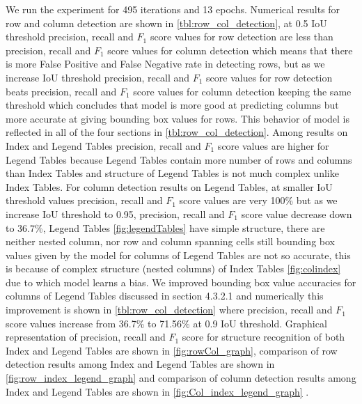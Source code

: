 We run the experiment for 495 iterations and 13 epochs. Numerical results for row and column detection are shown in \autoref{tbl:row_col_detection}, at 0.5 IoU threshold precision, recall and $F_1$ score values for row detection are less than precision, recall and $F_1$ score values for column detection which means that there is more False Positive and False Negative rate in detecting rows, but as we increase IoU threshold precision, recall and $F_1$ score values for row detection beats precision, recall and $F_1$ score values for column detection keeping the same threshold which concludes that model is more good at predicting columns but more accurate at giving bounding box values for rows. This behavior of model is reflected in all of the four sections in \autoref{tbl:row_col_detection}. Among results on Index and Legend Tables precision, recall and $F_1$ score values are higher for Legend Tables because Legend Tables contain more number of rows and columns than Index Tables and structure of Legend Tables is not much complex unlike Index Tables. For column detection results on Legend Tables, at smaller IoU threshold values precision, recall and $F_1$ score values are very 100\% but as we increase IoU threshold to 0.95, precision, recall and $F_1$ score value decrease down to 36.7\%, Legend Tables \autoref{fig:legendTables} have simple structure, there are neither nested column, nor row and column spanning cells still bounding box values given by the model for columns of Legend Tables are not so accurate, this is because of complex structure (nested columns) of Index Tables \autoref{fig:colindex} due to which model learns a bias. We improved  bounding box value accuracies for columns of Legend Tables discussed in section 4.3.2.1 and numerically this improvement is shown in \autoref{tbl:row_col_detection} where precision, recall and $F_1$ score values increase from 36.7\% to 71.56\% at 0.9 IoU threshold. Graphical representation of precision, recall and $F_1$ score for structure recognition of both Index and Legend Tables are shown in \autoref{fig:rowCol_graph}, comparison of row detection results among Index and Legend Tables are shown in \autoref{fig:row_index_legend_graph} and comparison of column detection results among Index and Legend Tables are shown in \autoref{fig:Col_index_legend_graph} .
